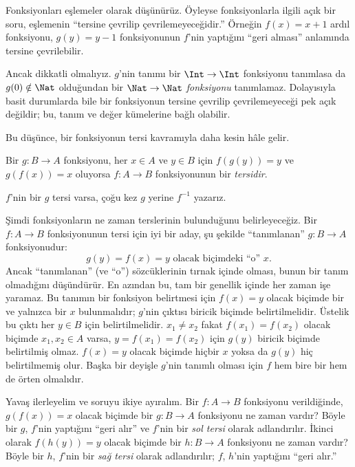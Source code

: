 \documentclass[../../../include/open-logic-section]{subfiles}
\begin{document}

\begin{explain}
Fonksiyonları eşlemeler olarak düşünürüz. Öyleyse fonksiyonlarla ilgili açık
bir soru, eşlemenin ``tersine çevrilip çevrilemeyeceğidir.'' Örneğin
$f(x)=x+1$ ardıl fonksiyonu, $g(y)=y-1$ fonksiyonunun $f$'nin yaptığını
``geri alması'' anlamında tersine çevrilebilir.

Ancak dikkatli olmalıyız. $g$'nin tanımı bir $\Int \to \Int$ fonksiyonu
tanımlasa da $g(0)\notin\Nat$ olduğundan bir \emph{$\Nat \to \Nat$
fonksiyonu} tanımlamaz. Dolayısıyla basit durumlarda bile bir fonksiyonun
tersine çevrilip çevrilemeyeceği pek açık değildir; bu, tanım ve değer
kümelerine bağlı olabilir.

Bu düşünce, bir fonksiyonun tersi kavramıyla daha kesin hâle gelir.
\end{explain}

\begin{defn}
Bir $g \colon B \to A$ fonksiyonu, her $x \in A$ ve $y \in B$ için
$f(g(y))=y$ ve $g(f(x))=x$ oluyorsa $f \colon A \to B$ fonksiyonunun bir
\emph{tersidir}.
\end{defn}

$f$'nin bir $g$ tersi varsa, çoğu kez $g$ yerine $f^{-1}$ yazarız.

\begin{explain}
Şimdi fonksiyonların ne zaman terslerinin bulunduğunu belirleyeceğiz. Bir
$f\colon A \to B$ fonksiyonunun tersi için iyi bir aday, şu şekilde
``tanımlanan'' $g\colon B \to A$ fonksiyonudur:
\[
g(y) = \text{$f(x)=y$ olacak biçimdeki ``o'' $x$.}
\]
Ancak ``tanımlanan'' (ve ``o'') sözcüklerinin tırnak içinde olması, bunun bir
tanım olmadığını düşündürür. En azından bu, tam bir genellik içinde her zaman
işe yaramaz. Bu tanımın bir fonksiyon belirtmesi için $f(x)=y$ olacak biçimde
bir ve yalnızca bir $x$ bulunmalıdır; $g$'nin çıktısı biricik biçimde
belirtilmelidir. Üstelik bu çıktı her $y \in B$ için belirtilmelidir.
$x_1\neq x_2$ fakat $f(x_1)=f(x_2)$ olacak biçimde $x_1,x_2\in A$ varsa,
$y=f(x_1)=f(x_2)$ için $g(y)$ biricik biçimde belirtilmiş olmaz. $f(x)=y$
olacak biçimde hiçbir $x$ yoksa da $g(y)$ hiç belirtilmemiş olur. Başka bir
deyişle $g$'nin tanımlı olması için $f$ hem bire bir hem de örten olmalıdır.

Yavaş ilerleyelim ve soruyu ikiye ayıralım. Bir $f\colon A \to B$ fonksiyonu
verildiğinde, $g(f(x))=x$ olacak biçimde bir $g\colon B \to A$ fonksiyonu ne
zaman vardır? Böyle bir $g$, $f$'nin yaptığını ``geri alır'' ve $f$'nin bir
\emph{sol tersi} olarak adlandırılır. İkinci olarak $f(h(y))=y$ olacak biçimde
bir $h\colon B \to A$ fonksiyonu ne zaman vardır? Böyle bir $h$, $f$'nin bir
\emph{sağ tersi} olarak adlandırılır; $f$, $h$'nin yaptığını ``geri alır.''
\end{explain}
\end{document}
